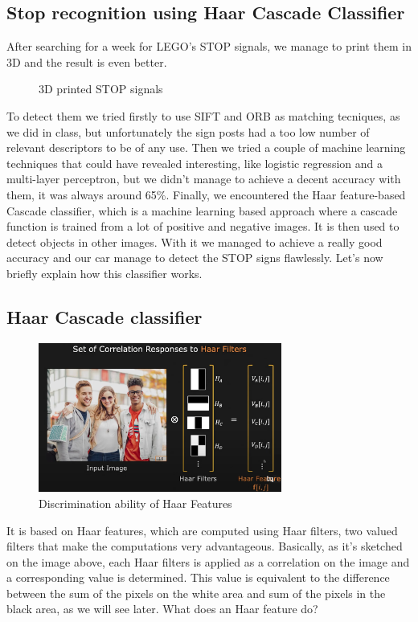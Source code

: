 \documentclass[12pt,a4paper]{article}
\begin{document}
\begin{large}
\section{Stop recognition using Haar Cascade Classifier}
After searching for a week for LEGO's STOP signals, we manage to print them in 3D and the result is even better.\par
\begin{figure} [h!]
  \centering
  \captionsetup{justification=centering}
  \caption{3D printed STOP signals}
  \end{figure}
To detect them we tried firstly to use SIFT and ORB as matching tecniques, as we did in class, but unfortunately the sign posts had a too low number of relevant descriptors to be of any use.
Then we tried a couple of machine learning techniques that could have revealed interesting, like logistic regression and a multi-layer perceptron, but we didn't manage to achieve a decent accuracy with them, it was always around 65\%.
Finally, we encountered the Haar feature-based Cascade classifier, which is a machine learning based approach where a cascade function is trained from a lot of positive and negative images. It is then used to detect objects in other images. With it we managed to achieve a really good accuracy and our car manage to detect the STOP signs flawlessly. Let's now briefly explain how this classifier works.


\subsection{Haar Cascade classifier}
\begin{figure} [!h]
  \centering
  \captionsetup{justification=centering}
  \includegraphics[width=8cm]{images/haar1.png}
  \caption{Discrimination ability of Haar Features}
  \end{figure}
It is based on Haar features, which are computed using Haar filters, two valued filters that make the computations very advantageous. Basically, as it's sketched on the image above, each Haar filters is applied as a correlation on the image and a corresponding value is determined. This value is equivalent to the difference between the sum of the pixels on the white area and sum of the pixels in the black area, as we will see later.
What does an Haar feature do?


\end{large}
\end{document}
